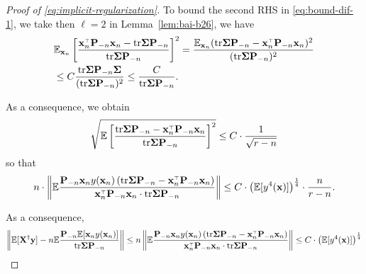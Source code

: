\documentclass[11pt]{article}
\begin{document}
\begin{proof}[Proof of \eqref{eq:implicit-regularization}]
To bound the second RHS in \eqref{eq:bound-dif-1}, we take then $\ell = 2$ in Lemma~\ref{lem:bai-b26}, we have
\begin{align*}
  &\E_{\x_n} \left[ \frac{ \x_n^\top \P_{-n} \x_n - \tr \Sigmab \P_{-n} }{ \tr \Sigmab \P_{-n} } \right]^2 = \frac{ \E_{\x_n} (\tr \Sigmab \P_{-n} - \x_n^\top \P_{-n} \x_n)^2 }{ (\tr \Sigmab \P_{-n})^2 } \\
  &\le C \frac{ \tr \Sigmab \P_{-n} \Sigmab }{ (\tr \Sigmab \P_{-n})^2 } \le \frac{C}{ \tr \Sigmab \P_{-n} }.
\end{align*}

As a consequence, we obtain
\[
   \sqrt{\E \left[ \frac{ \tr \Sigmab \P_{-n} - \x_n^\top \P_{-n} \x_n }{ \tr \Sigmab \P_{-n} } \right]^2 } \le C \cdot \frac1{\sqrt{r - n}}
\]
so that
\[
  n \cdot \left\|\E \frac{\P_{-n} \x_n y(\x_n) \left( \tr \Sigmab \P_{-n} - \x_n^\top \P_{-n} \x_n \right) }{ \x_n^\top \P_{-n} \x_n \cdot \tr \Sigmab \P_{-n} } \right\| \le C \cdot \left( \E[y^4(\x)] \right)^{\frac14} \cdot \frac{n}{r - n}.
\]


As a consequence,
\begin{align*}
  \left\| \E[\X^\dagger \y] - n \E \frac{\P_{-n} \E [\x_n y(\x_n)] }{ \tr \Sigmab \P_{-n} } \right\| \le n \left\| \E \frac{\P_{-n} \x_n y(\x_n) \left( \tr \Sigmab \P_{-n} - \x_n^\top \P_{-n} \x_n \right) }{ \x_n^\top \P_{-n} \x_n \cdot \tr \Sigmab \P_{-n} } \right\| \le C \cdot \left( \E[y^4(\x)] \right)^{\frac14} %
\end{align*}


\end{proof}
\end{document}
